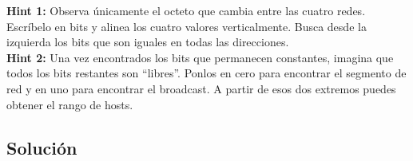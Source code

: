 \begin{tcolorbox}[enunciado]
\textbf{Hint 1:} Observa únicamente el octeto que cambia entre las cuatro redes. Escríbelo en bits y alinea los cuatro valores verticalmente. Busca desde la izquierda los bits que son iguales en todas las direcciones. \\
\textbf{Hint 2:} Una vez encontrados los bits que permanecen constantes, imagina que todos los bits restantes son ``libres''. Ponlos en cero para encontrar el segmento de red y en uno para encontrar el broadcast. A partir de esos dos extremos puedes obtener el rango de hosts.
\end{tcolorbox}

\subsection*{Solución}
